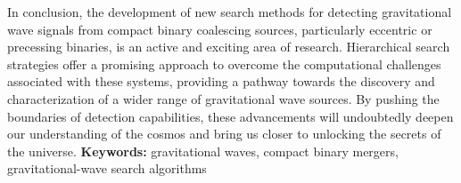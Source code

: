 In conclusion, the development of new search methods for detecting gravitational wave signals from compact binary coalescing sources, particularly eccentric or precessing binaries, is an active and exciting area of research. Hierarchical search strategies offer a promising approach to overcome the computational challenges associated with these systems, providing a pathway towards the discovery and characterization of a wider range of gravitational wave sources. By pushing the boundaries of detection capabilities, these advancements will undoubtedly deepen our understanding of the cosmos and bring us closer to unlocking the secrets of the universe.
\clearpage
\thispagestyle{plain}
\textbf{Keywords:} gravitational waves, compact binary mergers, gravitational-wave search algorithms
\thispagestyle{plain}

